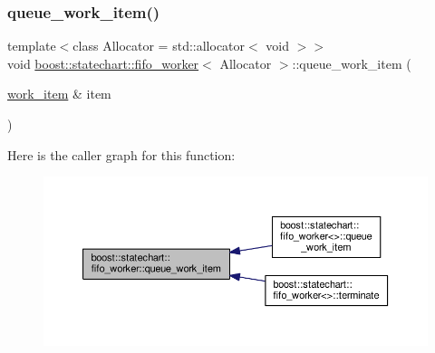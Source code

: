 \mbox{\label{classboost_1_1statechart_1_1fifo__worker_a1478832fd6093329616ddc0747674ae9}} 
\subsubsection{\texorpdfstring{queue\+\_\+work\+\_\+item()}{queue\_work\_item()}\hspace{0.1cm}{\footnotesize\ttfamily [1/2]}}
{\footnotesize\ttfamily template$<$class Allocator = std\+::allocator$<$ void $>$$>$ \\
void \mbox{\hyperlink{classboost_1_1statechart_1_1fifo__worker}{boost\+::statechart\+::fifo\+\_\+worker}}$<$ Allocator $>$\+::queue\+\_\+work\+\_\+item (\begin{DoxyParamCaption}\item[{\mbox{\hyperlink{classboost_1_1statechart_1_1fifo__worker_ac90f6805565bb3e8d65e4cdde96d90c2}{work\+\_\+item}} \&}]{item }\end{DoxyParamCaption})\hspace{0.3cm}{\ttfamily [inline]}}

Here is the caller graph for this function\+:
\nopagebreak
\begin{figure}[H]
\begin{center}
\leavevmode
\includegraphics[width=350pt]{classboost_1_1statechart_1_1fifo__worker_a1478832fd6093329616ddc0747674ae9_icgraph}
\end{center}
\end{figure}
\mbox{\label{classboost_1_1statechart_1_1fifo__worker_ae337753f66b8b8e9d5e473fdba656e5b}} 
